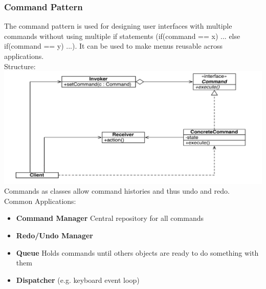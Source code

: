 \subsubsection{Command Pattern}
The command pattern is used for designing user interfaces with multiple commands without using multiple if statements (if(command == x) {...} else if(command == y) ...).
It can be used to make menus reusable across applications.\\
Structure:\\
\includegraphics[width=\linewidth]{images/pattern_command.png}
Commands as classes allow command histories and thus undo and redo.\\
Common Applications:
\begin{itemize}
  \item \textbf{Command Manager} Central repository for all commands
  \item \textbf{Redo/Undo Manager}
  \item \textbf{Queue} Holds commands until others objects are ready to do something with them
  \item \textbf{Dispatcher} (e.g. keyboard event loop)
\end{itemize}
\newpage